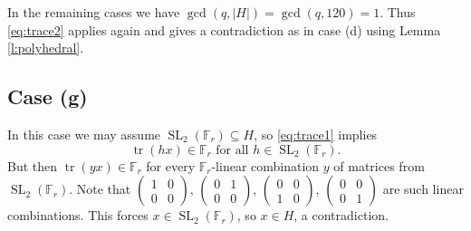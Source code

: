 \documentclass[12pt]{amsart}
\theoremstyle{plain}
\theoremstyle{definition}
\numberwithin{equation}{section}
\newcommand{\abs}[1]{\lvert#1\rvert}
\newcommand{\FF}{\mathbb F}
\DeclareMathOperator{\SL}{SL}
\DeclareMathOperator{\trace}{tr}
\begin{document}
In the remaining cases we have $\gcd(q,\abs{H})=\gcd(q,120)=1$. Thus
\eqref{eq:trace2} applies again and gives a contradiction as in case (d)
using Lemma \ref{l:polyhedral}.
\subsection{Case (g)}
In this case we may assume $\SL_2(\FF_r)\subseteq H$, so
\eqref{eq:trace1} implies\[ \trace(hx)\in\FF_r%
  \text{ for all }h\in\SL_2(\FF_r).
\]
But then $\trace(yx)\in\FF_r$ for every $\FF_r$-linear combination $y$
of matrices from $\SL_2(\FF_r)$. Note that %
$\begin{pmatrix}1 & 0\\0 & 0\end{pmatrix}$, %
$\begin{pmatrix}0 & 1\\0 & 0\end{pmatrix}$, %
$\begin{pmatrix}0 & 0\\1 & 0\end{pmatrix}$, %
$\begin{pmatrix}0 & 0\\0 & 1\end{pmatrix}$ %
are such linear combinations. This forces $x\in\SL_2(\FF_r)$, so
$x\in H$, a contradiction.
\printbibliography
\end{document}
